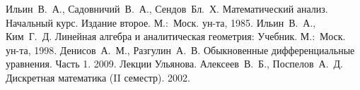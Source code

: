 \documentclass[11pt]{article}
\begin{document}
\begin{thebibliography}{99}
	 Ильин~В.~А., Садовничий~В.~А., Сендов~Бл.~Х. Математический анализ. Начальный курс. Издание второе. М.:~Моск. ун-та, 1985.
	 Ильин~В.~А., Ким~Г.~Д. Линейная алгебра и аналитическая геометрия: Учебник. М.:~Моск. ун-та, 1998.
	 Денисов~А.~М., Разгулин~А.~В. Обыкновенные дифференциальные уравнения. Часть 1. 2009.
	 Лекции Ульянова.
	 Алексеев~В.~Б., Поспелов~А.~Д. Дискретная математика (II семестр). 2002.
\end{thebibliography}
\end{document}

